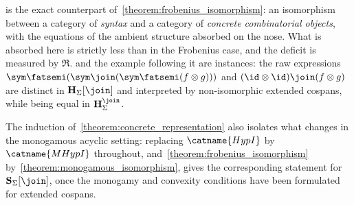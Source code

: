 \begin{remark}
 is the exact counterpart
of~\cref{theorem:frobenius_isomorphism}: an isomorphism between a category of
\emph{syntax} and a category of \emph{concrete combinatorial objects}, with the
equations of the ambient structure absorbed on the nose.
What is absorbed here is strictly less than in the Frobenius case, and the deficit
is measured by $\mathfrak{R}$.
 and the example following it are instances: the
raw expressions $\sym \fatsemi (\sym \join (\sym \fatsemi (f \otimes g)))$ and
$(\id \otimes \id) \join (f \otimes g)$ are distinct in
$\mathbf{H}_{\Sigma}[\join]$ and interpreted by non-isomorphic extended cospans, while
being equal in $\mathbf{H}^{\join}_{\Sigma}$.

The induction of~\cref{theorem:concrete_representation} also isolates what changes in
the monogamous acyclic setting: replacing $\catname{HypI}$ by $\catname{MHypI}$ throughout,
and~\cref{theorem:frobenius_isomorphism} by~\cref{theorem:monogamous_isomorphism}, gives
the corresponding statement for $\mathbf{S}_{\Sigma}[\join]$, once the monogamy and
convexity conditions have been formulated for extended cospans.
\end{remark}

